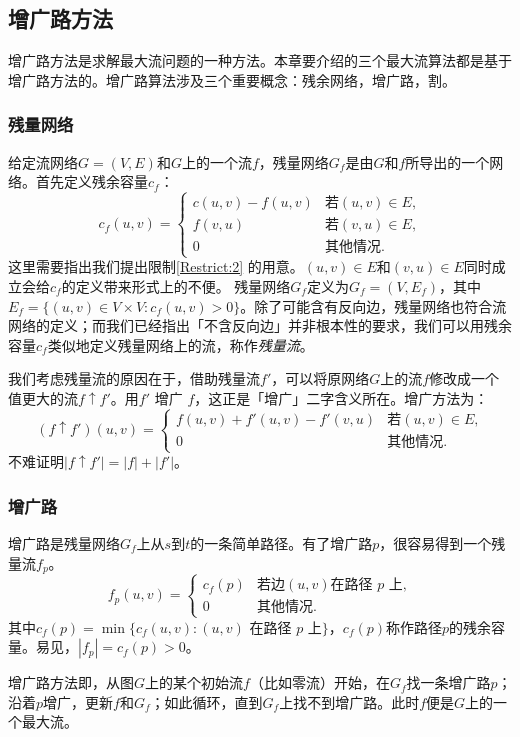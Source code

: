 \documentclass[fontset=ubuntu]{ctexbook}
\begin{document}
    \subsection{增广路方法}
    增广路方法是求解最大流问题的一种方法。本章要介绍的三个最大流算法都是基于增广路方法的。增广路算法涉及三个重要概念：残余网络，增广路，割。
    \subsubsection*{残量网络}
    给定流网络$G=(V,E)$和$G$上的一个流$f$，残量网络$G_f$是由$G$和$f$所导出的一个网络。首先定义残余容量$c_f$：
    \[
    c_f(u,v) =
    \begin{cases}
        c(u,v) - f(u,v) & \text{若$(u,v)\in E$,}\\
        f(v,u) & \text{若$(v,u)\in E$,} \\
        0 & \text{其他情况.}
    \end{cases}
    \]
    这里需要指出我们提出限制\ref{Restrict:2} 的用意。$(u,v)\in E$和$(v,u)\in E$同时成立会给$c_f$的定义带来形式上的不便。
    残量网络$G_f$定义为$G_f = (V, E_f)$，其中$E_f = \{(u,v)\in V\times V\colon c_f(u,v)>0\}$。除了可能含有反向边，残量网络也符合流网络的定义；而我们已经指出「不含反向边」并非根本性的要求，我们可以用残余容量$c_f$类似地定义残量网络上的流，称作\emph{残量流}。

    我们考虑残量流的原因在于，借助残量流$f'$，可以将原网络$G$上的流$f$修改成一个值更大的流$f\uparrow f'$。用$f'$ 增广 $f$，这正是「增广」二字含义所在。增广方法为：
    \[
    (f\uparrow f')(u,v) =\begin{cases}
    f(u,v) + f'(u,v) - f'(v,u) & \text{若$(u,v)\in E$,} \\
    0 & \text{其他情况.}
\end{cases}
    \]
    不难证明$|f\uparrow f'| = |f| + |f'|$。
    \subsubsection{增广路}
    增广路是残量网络$G_f$上从$s$到$t$的一条简单路径。有了增广路$p$，很容易得到一个残量流$f_p$。
    \[
    f_p(u,v) =\begin{cases}
    c_f(p) & \text{若边$(u,v)$在路径 $p$ 上,}\\
    0 & \text{其他情况.}
\end{cases}
    \]
    其中$c_f(p) = \min\{c_f(u,v)\colon (u,v)\text{ 在路径 }p\text{ 上} \}$，$c_f(p)$称作路径$p$的残余容量。易见，$|f_p| = c_f(p) > 0$。

    增广路方法即，从图$G$上的某个初始流$f$（比如零流）开始，在$G_f$找一条增广路$p$；沿着$p$增广，更新$f$和$G_f$；如此循环，直到$G_f$上找不到增广路。此时$f$便是$G$上的一个最大流。
\end{document}
